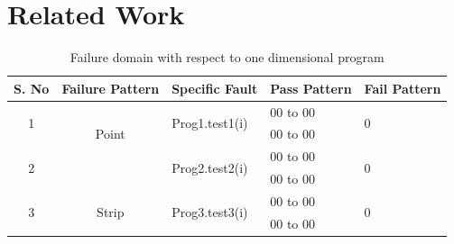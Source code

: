 \documentclass{acm_proc_article-sp}
\begin{document}
\section{Related Work} \label{sec:relatedWork}
\begin{table}[t]
\centering

\begin{tabular}{|c|c|l|l|l|}

\hline 

\textbf{S. No}		& \textbf{Failure Pattern}	& \textbf{Specific Fault}	 		& \textbf{Pass Pattern} 			& \textbf{Fail Pattern} 			\\ \hline 


\multirow{2}{*}{1} 	&\multirow{3}{*}{Point}	&\multirow{2}{*}{Prog1.test1(i)}	& 00 to 00				&\multirow{2}{*}{0}	  			\\ \cline{4-4} 
				&					&							&00 to 00				&	                           			\\ \cline{3-5} \hline
\multirow{2}{*}{2} 	&\multirow{3}{*}{Block}	&\multirow{2}{*}{Prog2.test2(i)}	&00 to 00				&\multirow{2}{*}{0}	  			\\ \cline{4-4} 
				&					&							&00 to 00				&	                           			\\ \cline{3-5} \hline
\multirow{2}{*}{3} 	&\multirow{3}{*}{Strip}	&\multirow{2}{*}{Prog3.test3(i)}	&00 to 00				&\multirow{2}{*}{0}	  			\\ \cline{4-4} 
				&					&							&00 to 00				&	                           			\\ \cline{3-5} \hline
\end{tabular}
\caption{Failure domain with respect to one dimensional program}
\label{tb:failtable}
\end{table}
\end{document}
